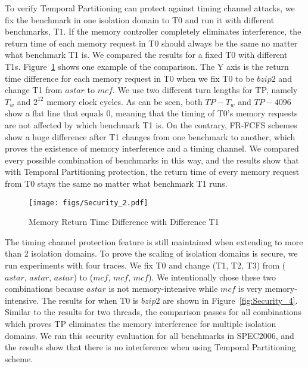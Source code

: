 To verify Temporal Partitioning can protect against timing channel attacks, we fix the 
benchmark in one isolation domain to T0 and run it with different benchmarks, T1. If the 
memory controller completely eliminates interference, the return time of each 
memory request in T0 should always be the same no matter what benchmark T1 is.  
We compared the results for a fixed T0 with different T1s.  
Figure~\ref{fig:Security_2} shows one example of the comparison. The Y 
axis is the return time difference for each memory request in T0 when we fix T0 
to be $bzip2$ and change T1 from $astar$ to $mcf$. We use two different turn 
lengths for TP, namely $T_w$ and $2^{12}$ memory clock cycles. As can be seen, 
both $TP-T_w$ and $TP-4096$ show a flat line that equals 0, meaning that the 
timing of T0's memory requests are not affected by which benchmark T1 is. On the 
contrary, FR-FCFS schemes show a huge difference after T1 changes from one 
benchmark to another, which proves the existence of memory interference and a
timing channel. We compared every possible combination of benchmarks in this 
way, and the results show that with Temporal Partitioning protection, the 
return time of every memory request from T0 stays the same no matter what 
benchmark T1 runs. 

\begin{figure}%
    \begin{center}
        \texttt{[image: figs/Security\_2.pdf]}
        \caption{Memory Return Time Difference with Difference T1}
        \label{fig:Security_2}
        \vspace{-0.20in}
    \end{center}
\end{figure}

The timing channel protection feature is still 
maintained when extending to more than 2 isolation domains. To prove the scaling of 
isolation domains is secure, we run experiments with four traces. We fix T0 and 
change (T1, T2, T3) from ($astar$, $astar$, $astar$) to ($mcf$, $mcf$, $mcf$).  
We intentionally chose these two combinations because $astar$ is not 
memory-intensive while $mcf$ is very memory-intensive. The results for when T0 
is $bzip2$ are shown in Figure~\ref{fig:Security_4}. Similar to the results for 
two threads, the comparison passes for all combinations which proves TP eliminates the memory interference for multiple isolation domains. We ran this security evaluation for all benchmarks in SPEC2006, and the results show that there is no interference when using 
Temporal Partitioning scheme. 

